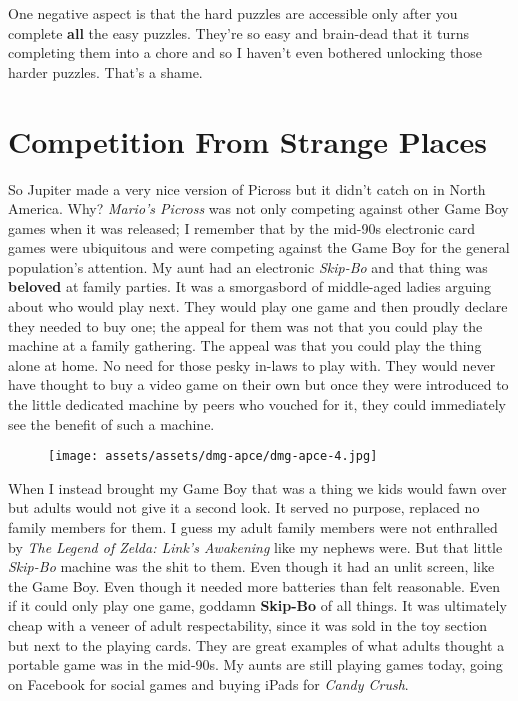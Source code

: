 \documentclass{book}
\begin{document}
One negative aspect is that the hard puzzles are accessible only after you complete \textbf{all} the easy puzzles. They’re so easy and brain-dead that it turns completing them into a chore and so I haven’t even bothered unlocking those harder puzzles. That’s a shame.

\FloatBarrier\needspace{5pt}\section*{Competition From Strange Places}\nopagebreak[4]

So Jupiter made a very nice version of Picross but it didn’t catch on in North America. Why? \emph{Mario’s Picross} was not only competing against other Game Boy games when it was released; I remember that by the mid-90s electronic card games were ubiquitous and were competing against the Game Boy for the general population’s attention. My aunt had an electronic \emph{Skip-Bo} and that thing was \textbf{beloved} at family parties. It was a smorgasbord of middle-aged ladies arguing about who would play next. They would play one game and then proudly declare they needed to buy one; the appeal for them was not that you could play the machine at a family gathering. The appeal was that you could play the thing alone at home. No need for those pesky in-laws to play with. They would never have thought to buy a video game on their own but once they were introduced to the little dedicated machine by peers who vouched for it, they could immediately see the benefit of such a machine.

\begin{figure}[hbt]
\vskip 10pt
\centering \texttt{[image: assets/assets/dmg-apce/dmg-apce-4.jpg]}
\vskip 6pt
\end{figure}
When I instead brought my Game Boy that was a thing we kids would fawn over but adults would not give it a second look. It served no purpose, replaced no family members for them. I guess my adult family members were not enthralled by \emph{The Legend of Zelda: Link’s Awakening} like my nephews were. But that little \emph{Skip-Bo} machine was the shit to them. Even though it had an unlit screen, like the Game Boy. Even though it needed more batteries than felt reasonable. Even if it could only play one game, goddamn \textbf{Skip-Bo} of all things. It was ultimately cheap with a veneer of adult respectability, since it was sold in the toy section but next to the playing cards. They are great examples of what adults thought a portable game was in the mid-90s. My aunts are still playing games today, going on Facebook for social games and buying iPads for \emph{Candy Crush}.
\end{document}

